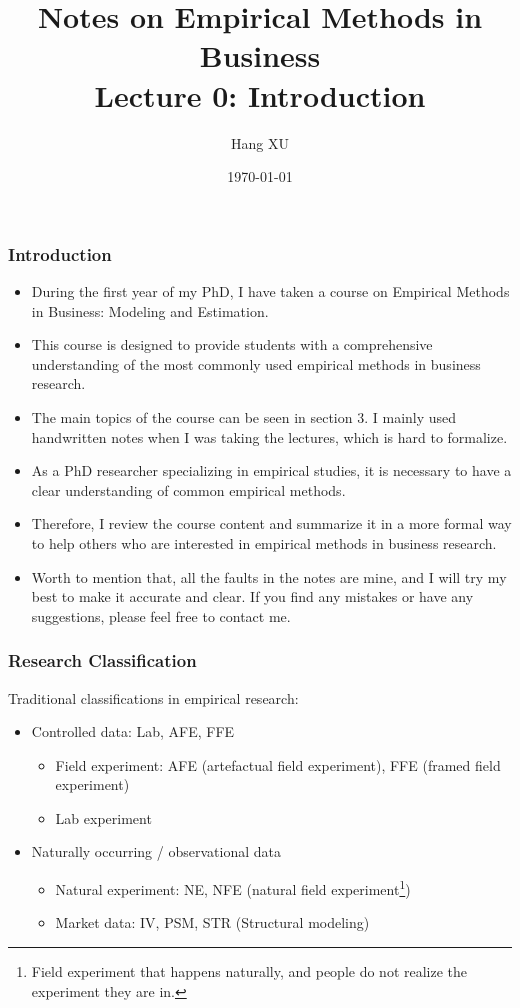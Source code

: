 \documentclass[10pt]{beamer}
\title{Notes on Empirical Methods in Business \\ Lecture 0: Introduction}
\author{Hang XU}
\institute{hxuch@connect.ust.hk}
\date{\today}
\begin{document}
\frame{\titlepage}

\begin{frame}
\frametitle{Introduction}
\begin{itemize}
    \item During the first year of my PhD, I have taken a course on Empirical Methods in Business: Modeling and Estimation. 
    \item This course is designed to provide students with a comprehensive understanding of the most commonly used empirical methods in business research. 
    \item The main topics of the course can be seen in section 3. I mainly used handwritten notes when I was taking the lectures, which is hard to formalize. 
    \item As a PhD researcher specializing in empirical studies, it is necessary to have a clear understanding of common empirical methods.
    \item Therefore, I review the course content and summarize it in a more formal way to help others who are interested in empirical methods in business research.
    \item Worth to mention that, all the faults in the notes are mine, and I will try my best to make it accurate and clear. If you find any mistakes or have any suggestions, please feel free to contact me.
\end{itemize}
\end{frame}

\begin{frame}
\frametitle{Research Classification}
Traditional classifications in empirical research:
\begin{itemize}
    \item Controlled data: Lab, AFE, FFE
    \begin{itemize}
        \item Field experiment: AFE (artefactual field experiment), FFE (framed field experiment)
        \item Lab experiment
    \end{itemize}
    \item Naturally occurring / observational data
    \begin{itemize}
        \item Natural experiment: NE, NFE (natural field experiment\footnote{Field experiment that happens naturally, and people do not realize the experiment they are in.})
        \item Market data: IV, PSM, STR (Structural modeling)
    \end{itemize}
\end{itemize}
\end{frame}
\end{document}
